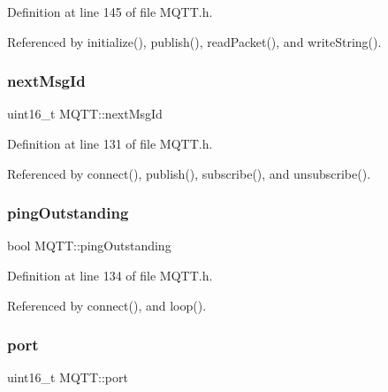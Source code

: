 Definition at line 145 of file M\+Q\+T\+T.\+h.



Referenced by initialize(), publish(), read\+Packet(), and write\+String().

\mbox{\label{class_m_q_t_t_ade1e9fc252b7ca59f30be31439ff84ab}} 
\subsubsection{\texorpdfstring{next\+Msg\+Id}{nextMsgId}}
{\footnotesize\ttfamily uint16\+\_\+t M\+Q\+T\+T\+::next\+Msg\+Id\hspace{0.3cm}{\ttfamily [private]}}



Definition at line 131 of file M\+Q\+T\+T.\+h.



Referenced by connect(), publish(), subscribe(), and unsubscribe().

\mbox{\label{class_m_q_t_t_ac02a4988506ab78812a1a9cc91be9007}} 
\subsubsection{\texorpdfstring{ping\+Outstanding}{pingOutstanding}}
{\footnotesize\ttfamily bool M\+Q\+T\+T\+::ping\+Outstanding\hspace{0.3cm}{\ttfamily [private]}}



Definition at line 134 of file M\+Q\+T\+T.\+h.



Referenced by connect(), and loop().

\mbox{\label{class_m_q_t_t_a27559174e21256b6235ff281ba605fe8}} 
\subsubsection{\texorpdfstring{port}{port}}
{\footnotesize\ttfamily uint16\+\_\+t M\+Q\+T\+T\+::port\hspace{0.3cm}{\ttfamily [private]}}



